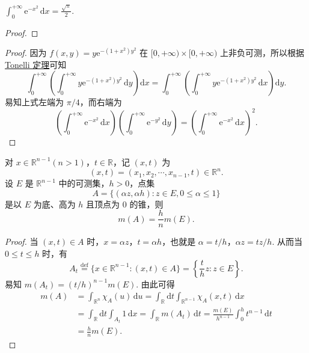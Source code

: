 \documentclass[../../main.tex]{subfiles}
\begin{document}
\begin{example}
$\int_0^{+\infty} \mathrm{e}^{-x^2} \, \mathrm{d}x = \frac{\sqrt{\pi}}{2}.$
\end{example}
\begin{proof}

\end{proof}
\begin{proof}
因为 \( f(x, y) = y \mathrm{e}^{-(1 + x^2)y^2} \) 在 \( [0, +\infty) \times [0, +\infty) \) 上非负可测，所以根据\hyperref[theorem:Tonelli 定理 非负可测函数的情形]{Tonelli 定理}可知
\[
\int_0^{+\infty} \left( \int_0^{+\infty} y \mathrm{e}^{-(1 + x^2)y^2} \, \mathrm{d}y \right) \mathrm{d}x = \int_0^{+\infty} \left( \int_0^{+\infty} y \mathrm{e}^{-(1 + x^2)y^2} \, \mathrm{d}x \right) \mathrm{d}y.
\]
易知上式左端为 \( \pi/4 \)，而右端为
\[
\left( \int_0^{+\infty} \mathrm{e}^{-x^2} \, \mathrm{d}x \right) \left( \int_0^{+\infty} \mathrm{e}^{-y^2} \, \mathrm{d}y \right) = \left( \int_0^{+\infty} \mathrm{e}^{-x^2} \, \mathrm{d}x \right)^2.
\]
\end{proof}

\begin{example}
对 \( x \in \mathbb{R}^{n - 1} (n > 1) \)，\( t \in \mathbb{R} \)，记 \( (x, t) \) 为
\[
(x, t) = (x_1, x_2, \cdots, x_{n - 1}, t) \in \mathbb{R}^n.
\]
设 \( E \) 是 \( \mathbb{R}^{n - 1} \) 中的可测集，\( h > 0 \)，点集
\[
A = \{ (\alpha z, \alpha h) : z \in E, 0 \leqslant \alpha \leqslant 1 \}
\]
是以 \( E \) 为底、高为 \( h \) 且顶点为 0 的锥，则
\[
m(A) = \frac{h}{n} m(E).
\]
\end{example}
\begin{proof}
当 \( (x, t) \in A \) 时，\( x = \alpha z \)，\( t = \alpha h \)，也就是 \( \alpha = t/h \)，\( \alpha z = t z / h \). 从而当 \( 0 \leqslant t \leqslant h \) 时，有
\[
A_t \stackrel{\text{def}}{=} \{ x \in \mathbb{R}^{n - 1} : (x, t) \in A \} = \left\{ \frac{t}{h} z : z \in E \right\}.
\]
易知 \( m(A_t) = (t/h)^{n - 1} m(E) \). 由此可得
\begin{align*}
m(A) &= \int_{\mathbb{R}^n} \chi_A(u) \, \mathrm{d}u = \int_{\mathbb{R}} \mathrm{d}t \int_{\mathbb{R}^{n - 1}} \chi_A(x, t) \, \mathrm{d}x \\
&= \int_{\mathbb{R}} \mathrm{d}t \int_{A_t} 1 \, \mathrm{d}x = \int_{\mathbb{R}} m(A_t) \, \mathrm{d}t = \frac{m(E)}{h^{n - 1}} \int_0^h t^{n - 1} \, \mathrm{d}t \\
&= \frac{h}{n} m(E).
\end{align*}
\end{proof}
\end{document}
